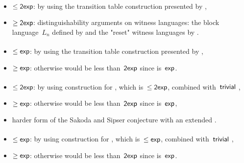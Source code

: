 \paragraph{\OLA{}\tto\ODFA}\label{cost:1LAto1DFA}
\begin{itemize}
	\item $\le\mathsf{2exp}$: by using the transition table construction presented by ,
	\item $\ge\mathsf{2exp}$: distinguishability arguments on witness languages: the block language~$L_n$ defined by %
	      and the "reset" witness languages by .
\end{itemize}
\paragraph{\OLA{}\tto\ONFA}\label{cost:1LAto1NFA}
\begin{itemize}
	\item $\le\mathsf{exp}$: by using the transition table construction presented by ,
	\item $\ge\mathsf{exp}$: otherwise \hyperref[cost:1LAto1DFA]{\OLA{}\tto\ODFA} would be less than~$\mathsf{2exp}$ since \hyperref[cost:1NFAto1DFA]{\ONFA{}\tto\ODFA} is~$\mathsf{exp}$.
\end{itemize}
\paragraph{\OLA{}\tto\TDFA}
\begin{itemize}
	\item $\le\mathsf{2exp}$: by using construction for \hyperref[cost:1LAto1DFA]{\OLA{}\tto\ODFA}, which is~$\le\mathsf{2exp}$, combined with~$\mathsf{trivial}$ \ODFA{}\tto\TDFA,
	\item $\ge\mathsf{exp}$: otherwise \hyperref[cost:1LAto1DFA]{\OLA{}\tto\ODFA} would be less than~$\mathsf{2exp}$ since \hyperref[cost:2DFAto1DFA]{\TDFA{}\tto\ODFA} is~$\mathsf{exp}$,
	\item harder form of the Sakoda and Sipser conjecture with an extended \TNFA.
\end{itemize}
\paragraph{\OLA{}\tto\TNFA}
\begin{itemize}
	\item $\le\mathsf{exp}$: by using construction for \hyperref[cost:1LAto1NFA]{\OLA{}\tto\ONFA}, which is~$\le\mathsf{exp}$, combined with~$\mathsf{trivial}$ \ONFA{}\tto\TNFA,
	\item $\ge\mathsf{exp}$: otherwise \hyperref[cost:1LAto1DFA]{\OLA{}\tto\ODFA} would be less than~$\mathsf{2exp}$ since \TNFA{}\tto\ODFA is~$\mathsf{exp}$.
\end{itemize}
